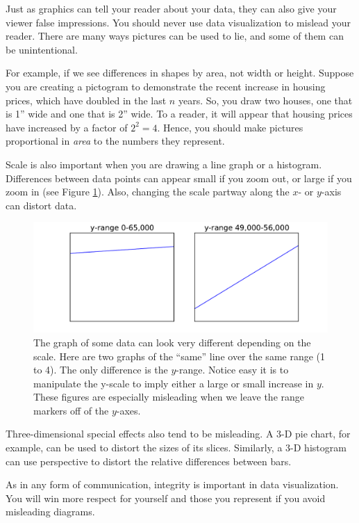 Just as graphics can tell your reader about your data, they can also give your viewer false impressions. 
You should never use data visualization to mislead your reader. 
There are many ways pictures can be used to lie, and some of them can be unintentional.

For example, if we see differences in shapes by area, not width or height. 
Suppose you are creating a pictogram to demonstrate the recent increase in housing prices, which have doubled in the last $n$ years. 
So, you draw two houses, one that is 1'' wide and one that is 2'' wide. 
To a reader, it will appear that housing prices have increased by a factor of $2^2=4$. 
Hence, you should make pictures proportional in \emph{area} to the numbers they represent.

Scale is also important when you are drawing a line graph or a histogram. 
Differences between data points can appear small if you zoom out, or large if you zoom in (see Figure \ref{fig:dog_plots}). 
Also, changing the scale partway along the $x$- or $y$-axis can distort data.

\begin{figure}
\centering
\includegraphics[width=\textwidth]{dog_plots.pdf}
\caption{The graph of some data can look very different depending on the scale. 
Here are two graphs of the ``same'' line over the same range (1 to 4). 
The only difference is the $y$-range. Notice easy it is to manipulate the y-scale to imply either a large or small increase in $y$. 
These figures are especially misleading when we leave the range markers off of the $y$-axes.}
\label{fig:dog_plots}
\end{figure}

Three-dimensional special effects also tend to be misleading. 
A 3-D pie chart, for example, can be used to distort the sizes of its slices. 
Similarly, a 3-D histogram can use perspective to distort the relative differences between bars.

As in any form of communication, integrity is important in data visualization. 
You will win more respect for yourself and those you represent if you avoid misleading diagrams.

\printbibliography
